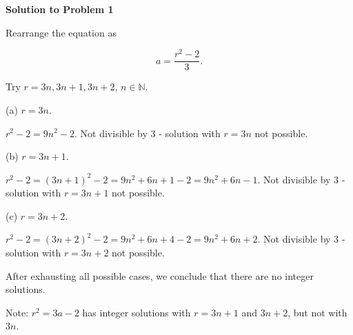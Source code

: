 \documentclass{article}
\begin{document}
{\bf Solution to Problem 1}

Rearrange the equation as

\begin{equation}
a=\frac{r^2-2}{3}.
\end{equation}

Try $r=3n, 3n+1, 3n+2$, $n\in \mathbb{N}$.

(a) $r=3n$.


$r^2-2=9n^2-2$. Not divisible by 3 - solution with $r=3n$ not possible.

(b) $r=3n+1$.

$r^2-2=(3n+1)^2-2=9n^2+6n+1-2=9n^2+6n-1$. Not divisible by 3 - solution with $r=3n+1$ not possible.

(c) $r=3n+2$.

$r^2-2=(3n+2)^2-2=9n^2+6n+4-2=9n^2+6n+2$. Not divisible by 3 - solution with $r=3n+2$ not possible.
 
After exhausting all possible cases, we conclude that there are no integer solutions.

Note: $r^2=3a-2$ has integer solutions with $r=3n+1$ and $3n+2$, but not with $3n$.
\end{document}
